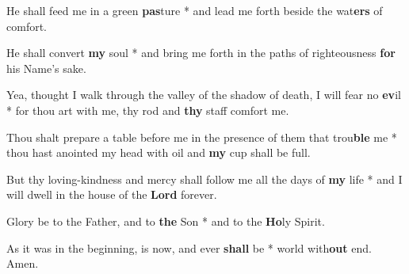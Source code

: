 \begin{multicols}{2}
	He shall feed me in a green \textbf{pas}ture * and lead me forth beside the wat\textbf{ers} of comfort.
	
	He shall convert \textbf{my} soul * and bring me forth in the paths of righteousness \textbf{for} his Name's sake.
	
	Yea, thought I walk through the valley of the shadow of death, I will fear no \textbf{ev}il * for thou art with me, thy rod and \textbf{thy} staff comfort me.
	
	Thou shalt prepare a table before me in the presence of them that trou\textbf{ble} me * thou hast anointed my head with oil and \textbf{my} cup shall be full.
	
	But thy loving-kindness and mercy shall follow me all the days of \textbf{my} life * and I will dwell in the house of the \textbf{Lord} forever.
	
	Glory be to the Father, and to \textbf{the} Son * and to the \textbf{Ho}ly Spirit.
	
	As it was in the beginning, is now, and ever \textbf{shall} be * world with\textbf{out} end. Amen.
\end{multicols}